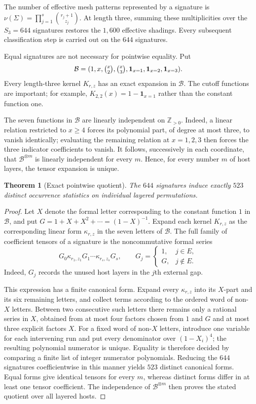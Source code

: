 \documentclass[12pt]{article}
\newtheorem{thm}{Theorem}[section]
\begin{document}
The number of effective mesh patterns represented by a signature is
$\nu(\Sigma)=\prod_{j=1}^s\binom{r_j+1}{z_j}$.  At length three, summing
these multiplicities over the $S_3=644$ signatures restores the $1{,}600$
effective shadings.  Every subsequent classification step is carried out on
the $644$ signatures.

Equal signatures are not necessary for pointwise equality.  Put
\[
\mathcal B=(1,x,\tbinom{x}{2},\tbinom{x}{3},
\mathbf1_{x=1},\mathbf1_{x=2},\mathbf1_{x=3}).
\]
Every length-three kernel $K_{r,z}$ has an exact expansion in $\mathcal B$.
The cutoff functions are important; for example,
$K_{2,2}(x)=1-\mathbf1_{x=1}$ rather than the constant function one.

The seven functions in $\mathcal B$ are linearly independent on
$\mathbb Z_{>0}$.  Indeed, a linear relation restricted to $x\ge4$ forces
its polynomial part, of degree at most three, to vanish identically; evaluating
the remaining relation at $x=1,2,3$ then forces the three indicator
coefficients to vanish.  It follows, successively in each coordinate, that
$\mathcal B^{\otimes m}$ is linearly independent for every $m$.  Hence, for
every number $m$ of host layers, the tensor expansion is unique.

\begin{thm}[Exact pointwise quotient]\label{thm:pointwise}
The $644$ signatures induce exactly $523$ distinct occurrence statistics on
individual layered permutations.
\end{thm}

\begin{proof}
Let $X$ denote the formal letter corresponding to the constant function $1$
in $\mathcal B$, and put $G=1+X+X^2+\cdots=(1-X)^{-1}$.  Expand each kernel
$K_{r,z}$ as the corresponding linear form $\kappa_{r,z}$ in the seven letters
of $\mathcal B$.  The full family of coefficient tensors of a signature is the
noncommutative formal series
\[
G_0\kappa_{r_1,z_1}G_1\cdots
\kappa_{r_s,z_s}G_s,
\qquad
G_j=\begin{cases}1,&j\in E,\\G,&j\notin E.\end{cases}
\]
Indeed, $G_j$ records the unused host layers in the $j$th external gap.

This expression has a finite canonical form.  Expand every $\kappa_{r,z}$
into its $X$-part and its six remaining letters, and collect terms according
to the ordered word of non-$X$ letters.  Between two consecutive such letters
there remains only a rational series in $X$, obtained from at most four
factors chosen from $1$ and $G$ and at most three explicit factors $X$.
For a fixed word of non-$X$ letters, introduce one variable for each intervening
run and put every denominator over $(1-X_i)^4$; the resulting polynomial
numerator is unique.  Equality is therefore decided by comparing a finite
list of integer numerator polynomials.  Reducing the $644$ signatures
coefficientwise in this manner yields $523$ distinct canonical forms.
Equal forms give identical tensors for every $m$, whereas distinct forms differ
in at least one tensor coefficient.  The independence of
$\mathcal B^{\otimes m}$ then proves the stated quotient over all layered hosts.
\end{proof}
\end{document}
